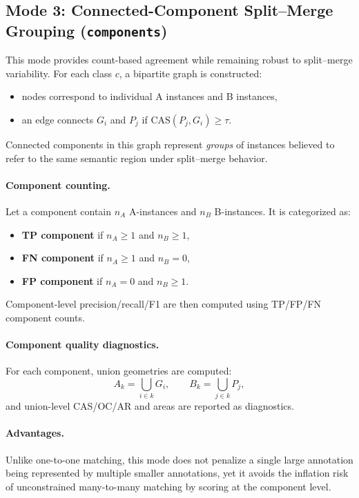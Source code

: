 \documentclass[11pt]{article}
\begin{document}
\subsection{Mode 3: Connected-Component Split--Merge Grouping (\texttt{components})}
This mode provides count-based agreement while remaining robust to split--merge variability.
For each class $c$, a bipartite graph is constructed:
\begin{itemize}[leftmargin=*]
  \item nodes correspond to individual A instances and B instances,
  \item an edge connects $G_i$ and $P_j$ if $\mathrm{CAS}(P_j,G_i)\ge\tau$.
\end{itemize}
Connected components in this graph represent \emph{groups} of instances believed to refer to the same semantic region under split--merge behavior.

\paragraph{Component counting.}
Let a component contain $n_A$ A-instances and $n_B$ B-instances.
It is categorized as:
\begin{itemize}[leftmargin=*]
  \item \textbf{TP component} if $n_A\ge 1$ and $n_B\ge 1$,
  \item \textbf{FN component} if $n_A\ge 1$ and $n_B=0$,
  \item \textbf{FP component} if $n_A=0$ and $n_B\ge 1$.
\end{itemize}
Component-level precision/recall/F1 are then computed using TP/FP/FN component counts.

\paragraph{Component quality diagnostics.}
For each component, union geometries are computed:
\[
A_k = \bigcup_{i\in k} G_i,\qquad B_k = \bigcup_{j\in k} P_j,
\]
and union-level CAS/OC/AR and areas are reported as diagnostics.

\paragraph{Advantages.}
Unlike one-to-one matching, this mode does not penalize a single large annotation being represented by multiple smaller annotations, yet it avoids the inflation risk of unconstrained many-to-many matching by scoring at the component level.
\end{document}
